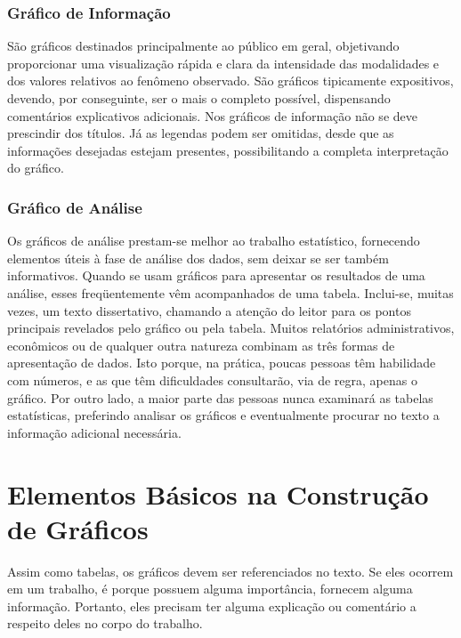 \subsubsection{Gráfico de Informação}

\inic São gráficos destinados principalmente ao público em geral, objetivando proporcionar uma visualização rápida e clara da intensidade das modalidades e dos valores relativos ao fenômeno observado. São gráficos tipicamente expositivos, devendo, por conseguinte, ser o mais o completo possível, dispensando comentários explicativos adicionais. Nos gráficos de informação não se deve prescindir dos títulos. Já as legendas podem ser omitidas, desde que as informações desejadas  estejam presentes, possibilitando a completa interpretação do gráfico.

\subsubsection{Gráfico de Análise}

\inic Os gráficos de análise prestam-se melhor ao trabalho estatístico, fornecendo elementos úteis à fase de análise dos dados, sem deixar se ser também informativos. Quando se usam gráficos para apresentar os resultados de uma análise, esses freqüentemente vêm acompanhados de uma tabela. Inclui-se, muitas vezes, um texto dissertativo, chamando a atenção do leitor para os pontos principais revelados pelo gráfico ou pela tabela. Muitos relatórios administrativos, econômicos ou de qualquer outra natureza combinam as três formas de apresentação de dados. Isto porque, na prática, poucas pessoas têm habilidade com números, e as que têm dificuldades consultarão, via de regra, apenas o gráfico. Por outro lado, a maior parte das pessoas nunca examinará as tabelas estatísticas, preferindo analisar os gráficos e eventualmente procurar no texto a informação adicional necessária.\vskip0.3cm



\section{Elementos  Básicos na Construção de Gráficos}


\inic Assim como tabelas, os gráficos devem ser referenciados no texto. Se eles ocorrem em um trabalho, é porque possuem alguma importância, fornecem alguma informação. Portanto, eles precisam ter alguma explicação ou comentário a respeito deles no corpo do trabalho.\vskip0.3cm 


